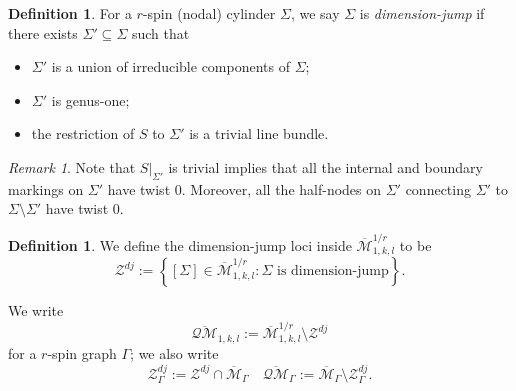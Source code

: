 \documentclass[11pt]{amsart}
\theoremstyle{definition}
\newtheorem{dfn}[dummy]{Definition}
\theoremstyle{remark}
\newtheorem{rmk}[dummy]{Remark}
\newcommand{\oQMb}{{\overline{\mathcal{QM}}}}
\newcommand{\<}{\left<}
\renewcommand{\>}{\right>}
\numberwithin{equation}{section}
\def\Mbar{{\overline{\mathcal M}}}
\begin{document}
\begin{dfn}
    For a $r$-spin (nodal) cylinder $\Sigma$, we say $\Sigma$ is \textit{dimension-jump} if there exists $\Sigma'\subseteq \Sigma$ such that
    \begin{itemize}
        \item $\Sigma'$ is a union of irreducible components of $\Sigma$;
        \item $\Sigma'$ is genus-one;
        \item the restriction of $S$ to $\Sigma'$ is a trivial line bundle.
    \end{itemize}
\end{dfn}
\begin{rmk}
    Note that $S\vert_{\Sigma'}$ is trivial implies that all the internal and boundary markings on $\Sigma'$ have twist $0$. Moreover, all the half-nodes on $\Sigma'$ connecting $\Sigma'$ to $\Sigma\setminus\Sigma'$ have twist $0$.
\end{rmk}

\begin{dfn}
    We define the dimension-jump loci inside $\Mbar^{1/r}_{1,k,l}$ to %
be  
    \begin{equation*}
         \mathcal Z^{dj}:=\left\{[\Sigma]\in \Mbar^{1/r}_{1,k,l} \colon \Sigma \text{ is dimension-jump}\right\}.
    \end{equation*}

    We %
write 
    \begin{equation*}
        \oQMb_{1,k,l}:=\Mbar^{1/r}_{1,k,l}\setminus \mathcal Z^{dj}
    \end{equation*}
    for %
a $r$-spin %
graph $\Gamma$; we %
also write 
    \begin{equation*}
        \mathcal Z^{dj}_{\Gamma}:=\mathcal Z^{dj}\cap \Mbar_{\Gamma}\quad\oQMb_\Gamma:=\Mbar_\Gamma\setminus \mathcal Z^{dj}_{\Gamma}.
    \end{equation*}
\end{dfn}
\end{document}
